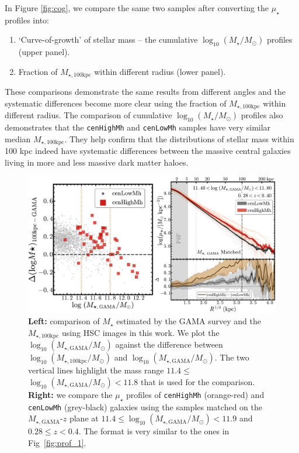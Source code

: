 \documentclass[a4paper,fleqn,usenatbib]{mnras}
\def\rbcg{\texttt{cenHighMh}}
\def\nbcg{\texttt{cenLowMh}}
\def\mstar{{$M_{\star}$}}
\def\logms{{$\log_{10} (M_{\star}/M_{\odot})$}}
\def\mtot{{$M_{\star,100\mathrm{kpc}}$}}
\def\mgama{{$M_{\star,\mathrm{GAMA}}$}}
\def\logmtot{{$\log_{10} (M_{\star,100\mathrm{kpc}}/M_{\odot})$}}
\def\logmgama{{$\log_{10} (M_{\star,\mathrm{GAMA}}/M_{\odot})$}}
\def\mden{{$\mu_{\star}$}}
\begin{document}
	In Figure \ref{fig:cog}, we compare the same two samples after converting the 
	\mden{} profiles into: 
	
	\begin{enumerate}
	
	    \item `Curve-of-growth' of stellar mass -- the cumulative \logms{} profiles
	        (upper panel).
	    
	    \item Fraction of \mtot{} within different radius (lower panel).
	
	\end{enumerate}
	
	These comparisons demonstrate the same results from different angles and 
	the systematic differences become more clear using the fraction of \mtot{}
	within different radius.  
	The comparison of cumulative \logms{} profiles also demonstrates that the 
	\rbcg{} and \nbcg{} samples have very similar median \mtot{}.  
    They help confirm that the distributions of stellar mass within 100 kpc indeed 
    have systematic differences between the massive central galaxies living in more 
    and less massive dark matter haloes. 


\begin{figure}
    \centering
    \includegraphics[width=16cm]{fig/redbcg_prof_gama_new}
    \caption{
        \textbf{Left:} comparison of \mstar{} estimated by the GAMA survey and 
        the \mtot{} using HSC images in this work. 
        We plot the \logmgama{} against the difference between \logmtot{} and \logmgama{}. 
        The two vertical lines highlight the mass range $11.4 \leq$\logmgama{}$<11.8$ 
        that is used for the comparison.~~
        \textbf{Right:} we compare the \mden{} profiles of \rbcg{} (orange-red) and 
        \nbcg{} (grey-black) galaxies using the samples matched on the 
        \mgama{}-$z$ plane at $11.4 \leq$\logmgama{}$<11.9$ and $0.28 \leq z < 0.4$. 
        The format is very similar to the ones in Fig~\ref{fig:prof_1}.}
    \label{fig:gama}
\end{figure}
\end{document}
